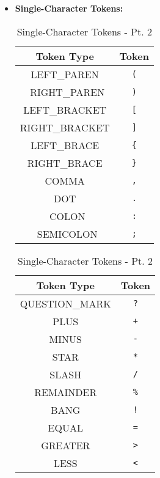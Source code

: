 \begin{itemize}
    \item \textbf{Single-Character Tokens:}

    \begin{table}[h!]
        \centering
        \begin{minipage}{0.45\textwidth}
            \centering
            \begin{tabular}{|c|c|}
                \hline
                \textbf{Token Type} & \textbf{Token} \\
                \hline
                LEFT\_PAREN & \texttt{(} \\ \
                RIGHT\_PAREN & \texttt{)} \\ 
                LEFT\_BRACKET & \texttt{[} \\ 
                RIGHT\_BRACKET & \texttt{]} \\ 
                LEFT\_BRACE & \texttt{\{} \\ 
                RIGHT\_BRACE & \texttt{\}} \\ 
                COMMA & \texttt{,} \\ 
                DOT & \texttt{.} \\ \
                COLON & \texttt{:} \\ \
                SEMICOLON & \texttt{;} \\ 
                \hline
            \end{tabular}
            \caption{Single-Character Tokens - Pt. 1}
        \end{minipage}
        \hfill
        \begin{minipage}{0.45\textwidth}
            \centering
            \begin{tabular}{|c|c|}
                \hline
                \textbf{Token Type} & \textbf{Token} \\
                \hline
                QUESTION\_MARK & \texttt{?} \\ 
                PLUS & \texttt{+} \\ 
                MINUS & \texttt{-} \\ 
                STAR & \texttt{*} \\ 
                SLASH & \texttt{/} \\ 
                REMAINDER & \texttt{\%} \\ 
                BANG & \texttt{!} \\ 
                EQUAL & \texttt{=} \\ 
                GREATER & \texttt{>} \\ 
                LESS & \texttt{<} \\ 
                \hline
            \end{tabular}
            \caption{Single-Character Tokens - Pt. 2}
        \end{minipage}
    \end{table}


\end{itemize}
